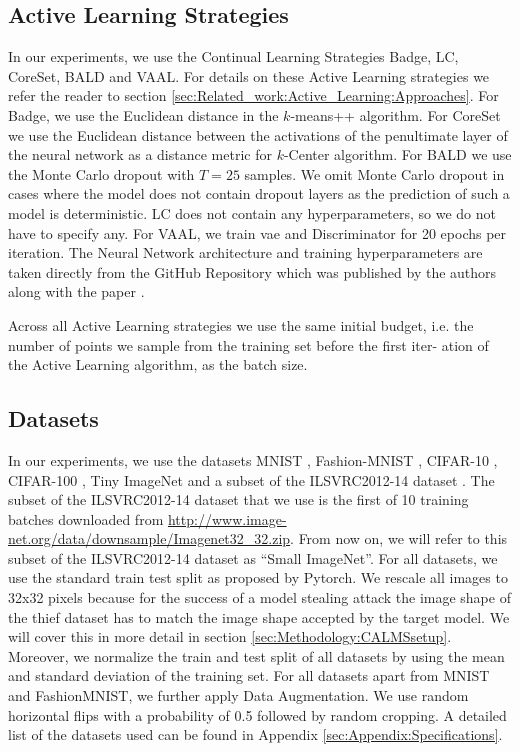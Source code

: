 \subsection{Active Learning Strategies}
\label{sec:ExperimentSetup:ALStrategies}
In our experiments, we use the Continual Learning Strategies Badge, LC, CoreSet, BALD and VAAL. For details on these Active Learning strategies we refer
the reader to section \ref{sec:Related_work:Active_Learning:Approaches}. For Badge, we use the Euclidean distance in the $k$-means++ algorithm.
For CoreSet we use the Euclidean distance between the activations of the penultimate layer of the neural network as a distance metric for $k$-Center
algorithm. For BALD we use the Monte Carlo dropout with $T=25$ samples. We omit Monte Carlo dropout in cases where the model does not contain dropout
layers as the prediction of such a model is deterministic. LC does not contain any hyperparameters, so we do not have to specify any. For VAAL, we train
\gls{vae} and Discriminator for 20 epochs per iteration. The Neural Network architecture and training hyperparameters are taken directly from the GitHub Repository which
was published by the authors along with the paper \cite{vaalRepo}. \par
Across all Active Learning strategies we use the same initial budget, i.e. the number of points we sample from the training set before the first iter-
ation of the Active Learning algorithm, as the batch size.

\subsection{Datasets}
\label{sec:ExperimentSetup:Datasets}
In our experiments, we use the datasets MNIST \cite{mnist_web}, Fashion-MNIST \cite{xiao2017fashion}, CIFAR-10 \cite{cifar},
CIFAR-100 \cite{cifar}, Tiny ImageNet \cite{le2015tiny} and a subset of the ILSVRC2012-14 dataset \cite{imagenet}. The subset of the ILSVRC2012-14 dataset that we
use is the first of 10 training batches downloaded from \url{http://www.image-net.org/data/downsample/Imagenet32_32.zip}. From now on, we will refer to this subset
of the ILSVRC2012-14 dataset as \enquote{Small ImageNet}. For all datasets, we use the standard train test split as proposed by Pytorch. We rescale all images to 32x32
pixels because for the success of a model stealing attack the image shape of the thief dataset has to match the image shape accepted by the target model. We will cover
this in more detail in section \ref{sec:Methodology:CALMSsetup}. Moreover, we normalize the train and test split of all datasets by using the mean and standard deviation
of the training set. For all datasets apart from MNIST and FashionMNIST, we further apply Data Augmentation. We use random horizontal flips with a probability of 0.5
followed by random cropping. A detailed list of the datasets used can be found in Appendix \ref{sec:Appendix:Specifications}. \par


